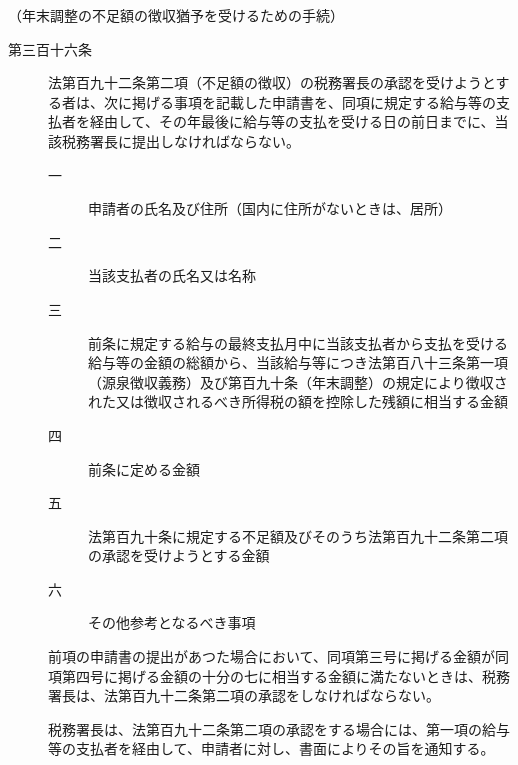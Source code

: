 \documentclass[twocolumn,a4j,10pt]{ltjtarticle}
\begin{document}
\noindent\hspace{10pt}（年末調整の不足額の徴収猶予を受けるための手続）
\begin{description}
\item[第三百十六条]法第百九十二条第二項（不足額の徴収）の税務署長の承認を受けようとする者は、次に掲げる事項を記載した申請書を、同項に規定する給与等の支払者を経由して、その年最後に給与等の支払を受ける日の前日までに、当該税務署長に提出しなければならない。
\begin{description}
\item[一]申請者の氏名及び住所（国内に住所がないときは、居所）
\item[二]当該支払者の氏名又は名称
\item[三]前条に規定する給与の最終支払月中に当該支払者から支払を受ける給与等の金額の総額から、当該給与等につき法第百八十三条第一項（源泉徴収義務）及び第百九十条（年末調整）の規定により徴収された又は徴収されるべき所得税の額を控除した残額に相当する金額
\item[四]前条に定める金額
\item[五]法第百九十条に規定する不足額及びそのうち法第百九十二条第二項の承認を受けようとする金額
\item[六]その他参考となるべき事項
\end{description}
\item[]前項の申請書の提出があつた場合において、同項第三号に掲げる金額が同項第四号に掲げる金額の十分の七に相当する金額に満たないときは、税務署長は、法第百九十二条第二項の承認をしなければならない。
\item[]税務署長は、法第百九十二条第二項の承認をする場合には、第一項の給与等の支払者を経由して、申請者に対し、書面によりその旨を通知する。
\end{description}
\end{document}
